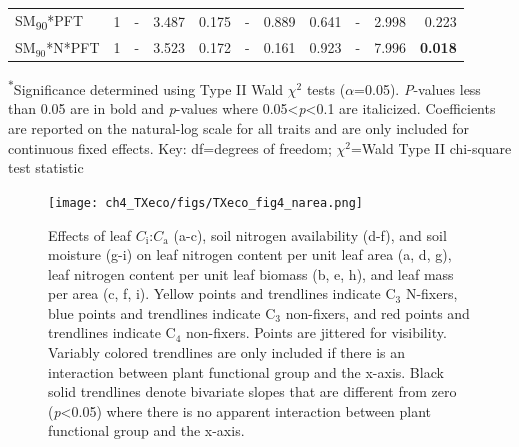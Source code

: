 \begin{landscape}
\begin{table}
{\begin{tabular}{p{3.75cm}p{0.5cm}p{1.75cm}p{1.5cm}p{1.5cm}p{1.75cm}p{1.5cm}p{1.5cm}p{1.75cm}p{1.5cm}p{1.5cm}}
            SM\textsubscript{90}*PFT & \multicolumn{1}{r}{1}
            & \multicolumn{1}{r}{-}             & \multicolumn{1}{r}{3.487}         & \multicolumn{1}{r}{0.175}
            & \multicolumn{1}{r}{-}             & \multicolumn{1}{r}{0.889}         & \multicolumn{1}{r}{0.641}
            & \multicolumn{1}{r}{-}             & \multicolumn{1}{r}{2.998}         & \multicolumn{1}{r}{0.223} 
            \\

            SM$_{90}$*N*PFT & \multicolumn{1}{r}{1}
            & \multicolumn{1}{r}{-}             & \multicolumn{1}{r}{3.523}         & \multicolumn{1}{r}{0.172}
            & \multicolumn{1}{r}{-}             & \multicolumn{1}{r}{0.161}         & \multicolumn{1}{r}{0.923}
            & \multicolumn{1}{r}{-}             & \multicolumn{1}{r}{7.996}         & \multicolumn{1}{r}{\textbf{0.018}}
            \\
            \hline

    \end{tabular}}
    \label{tab:table4.4}
\end{table}
\begin{singlespace}
    \noindent \textsuperscript{$*$}Significance determined using Type II Wald $\chi^{2}$ tests ($\alpha$=0.05). \textit{P}-values less than 0.05 are in bold and \textit{p}-values where 0.05<\textit{p}<0.1 are italicized. Coefficients are reported on the natural-log scale for all traits and are only included for continuous fixed effects. Key: df=degrees of freedom; $\chi^2$=Wald Type II chi-square test statistic
\end{singlespace}
\end{landscape}
\clearpage

\newpage
    \begin{figure}
        \centering
        \texttt{[image: ch4\_TXeco/figs/TXeco\_fig4\_narea.png]}
        \caption[Effects of leaf $C_\mathrm{i}$:$C_\mathrm{a}$, soil nitrogen availability, and soil moisture on leaf nitrogen content per unit leaf area, leaf nitrogen content per unit leaf biomass, and leaf mass per area.]{Effects of leaf $C_\mathrm{i}$:$C_\mathrm{a}$ (a-c), soil nitrogen availability (d-f), and soil moisture (g-i) on leaf nitrogen content per unit leaf area (a, d, g), leaf nitrogen content per unit leaf biomass (b, e, h), and leaf mass per area (c, f, i). Yellow points and trendlines indicate C$_3$ N-fixers, blue points and trendlines indicate C$_3$ non-fixers, and red points and trendlines indicate C$_4$ non-fixers. Points are jittered for visibility. Variably colored trendlines are only included if there is an interaction between plant functional group and the x-axis. Black solid trendlines denote bivariate slopes that are different from zero (\textit{p}<0.05) where there is no apparent interaction between plant functional group and the x-axis.}
        \label{fig:figure4.4}
    \end{figure}
\clearpage

